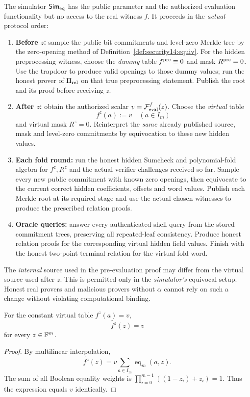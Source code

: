 \begin{definition}\label{def:security14:online-sim}
The simulator $\mathsf{Sim}_{\rm eq}$
has the public parameter and
the authorized evaluation
functionality but no access
to the real witness $f$.
It proceeds in the \emph{actual}
protocol order:
\begin{enumerate}[label=\textup{(\roman*)}]
\item \textbf{Before $z$:}
sample the public bit
commitments and level-zero
Merkle tree by the zero-opening
method of
Definition~\ref{def:security14:equiv}.
For the hidden preprocessing
witness, choose the \emph{dummy}
table $f^{\rm pre}\equiv0$
and mask $R^{\rm pre}=0$.
Use the trapdoor to produce
valid openings to those dummy
values; run the honest prover
of $\Pi_{\rm rel}$ on that true
preprocessing statement.
Publish the root and its proof
before receiving $z$.
\item \textbf{After $z$:}
obtain the authorized scalar
$v=\mathcal F_{\rm eval}^f(z)$.
Choose the \emph{virtual}
table
\[
 \boxed{f^{z}(a):=v
       \quad(a\in I_m)}
\]
and virtual mask $R^z=0$.
Reinterpret the \emph{same}
already published source,
mask and level-zero
commitments by equivocation
to these new hidden values.
\item \textbf{Each fold round:}
run the honest hidden
Sumcheck and polynomial-fold
algebra for $f^z,R^z$ and
the actual verifier
challenges received so far.
Sample every new public
commitment with known
zero openings, then
equivocate to the
current correct hidden
coefficients, offsets
and word values.
Publish each Merkle root
at its required stage and
use the actual chosen
witnesses to produce
the prescribed relation
proofs.
\item \textbf{Oracle queries:}
answer every authenticated
shell query from the stored
commitment trees, preserving
all repeated-leaf consistency.
Produce honest relation
proofs for the corresponding
virtual hidden field values.
Finish with the honest
two-point terminal relation
for the virtual fold word.
\end{enumerate}
The \emph{internal} source
used in the pre-evaluation
proof may differ from
the virtual source used
after $z$. This is permitted
only in the \emph{simulator's}
equivocal setup. Honest
real provers and malicious
provers without $\alpha$
cannot rely on such a
change without violating
computational binding.
\end{definition}

\begin{lemma}\label{lem:security14:virtual-eval}
For the constant virtual
table $f^z(a)=v$,
\[
 \boxed{\widetilde{f^z}(z)=v}
\]
for every $z\in\mathbb{F}^m$.
\end{lemma}
\begin{proof}
By multilinear interpolation,
\[
 \widetilde{f^z}(z)
 =v\sum_{a\in I_m}
 \operatorname{eq}_m(a,z).
\]
The sum of all Boolean
equality weights is
$\prod_{i=0}^{m-1}
((1-z_i)+z_i)=1$.
Thus the expression equals
$v$ identically.
\end{proof}

